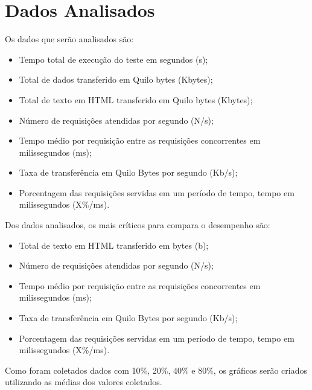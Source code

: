 \section{Dados Analisados}
Os dados que serão analisados são:
\begin{itemize}
	\item Tempo total de execução do teste em segundos (s); %
	\item Total de dados transferido em Quilo bytes (Kbytes); %
	\item Total de texto em HTML transferido em Quilo bytes (Kbytes); 
	\item Número de requisições atendidas por segundo (N/s); %
	\item Tempo médio por requisição entre as requisições concorrentes em 
	milissegundos (ms); %
	\item Taxa de transferência em Quilo Bytes por segundo (Kb/s); %
	\item Porcentagem das requisições servidas em um período de tempo, tempo em 
	milissegundos (X\%/ms). %
\end{itemize}
Dos dados analisados, os mais críticos para compara o desempenho são:
\begin{itemize}
	\item Total de texto em HTML transferido em bytes (b);
	\item Número de requisições atendidas por segundo (N/s);
	\item Tempo médio por requisição entre as requisições concorrentes em 
	milissegundos (ms);
	\item Taxa de transferência em Quilo Bytes por segundo (Kb/s);
	\item Porcentagem das requisições servidas em um período de tempo, tempo em 
	milissegundos (X\%/ms).
\end{itemize}
Como foram coletados dados com 10\%, 20\%, 40\% e 80\%, os gráficos serão 
criados utilizando as médias dos valores coletados.




